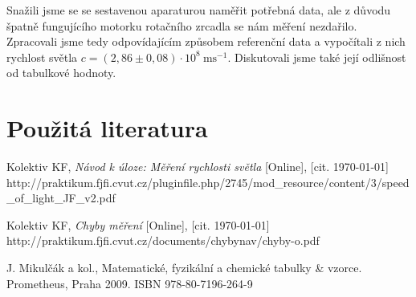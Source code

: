 \documentclass[english]{article}
\newcommand{\unit}[1]{\ \mathrm{#1}}
\begin{document}
	Snažili jsme se se sestavenou aparaturou naměřit potřebná data, ale z důvodu špatně fungujícího motorku rotačního zrcadla se nám měření nezdařilo. Zpracovali jsme tedy odpovídajícím způsobem referenční data a vypočítali z nich rychlost světla $c = (2,86\pm0,08)\cdot 10^8\unit{ms^{-1}}$. Diskutovali jsme také její odlišnost od tabulkové hodnoty.

\section {Použitá literatura}
\begingroup
\renewcommand{\section}[2]{}

\begin{thebibliography}{9}
 Kolektiv KF, \emph{Návod k úloze: Měření rychlosti světla} [Online], [cit. \today] \newline http://praktikum.fjfi.cvut.cz/pluginfile.php/2745/mod\_resource/content/3/speed\_of\_light\_JF\_v2.pdf



 Kolektiv KF, \emph{Chyby měření} [Online], [cit. \today] \newline http://praktikum.fjfi.cvut.cz/documents/chybynav/chyby-o.pdf


 J. Mikulčák a kol., Matematické, fyzikální a chemické tabulky \& vzorce. Prometheus,
Praha 2009.\newline
ISBN 978-80-7196-264-9
%


\end{thebibliography}
\endgroup
\setcounter{equation}{0}
\end{document}
